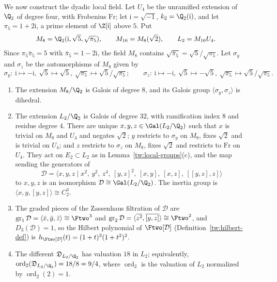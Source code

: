 We now construct the dyadic local field. Let $U_4$ be the
unramified extension of $\Q_2$ of degree four, with Frobenius $\mathrm{Fr}$;
let $\mathrm i=\sqrt{-1}$, $k_2=\Q_2(\mathrm i)$, and let
$\pi_5=1+2\mathrm i$, a prime element of $\Z[\mathrm i]$ above $5$. Put
\[
 M_8=\Q_2(\mathrm i,\sqrt5,\sqrt{\pi_5}),\qquad M_{16}=M_8(\sqrt2),\qquad
 L_2=M_{16}U_4 .
\]
Since $\pi_5\bar\pi_5=5$ with $\bar\pi_5=1-2\mathrm i$, the field $M_8$ contains
$\sqrt{\bar\pi_5}=\sqrt5/\sqrt{\pi_5}$. Let $\sigma_y$ and $\sigma_z$ be the
automorphisms of $M_8$ given by
\[
 \sigma_y:\ \mathrm i\mapsto-\mathrm i,\ \sqrt5\mapsto\sqrt5,\ \sqrt{\pi_5}\mapsto\sqrt5/\sqrt{\pi_5};
 \qquad
 \sigma_z:\ \mathrm i\mapsto-\mathrm i,\ \sqrt5\mapsto-\sqrt5,\ \sqrt{\pi_5}\mapsto\sqrt5/\sqrt{\pi_5}.
\]

\begin{lemma}\label{tw:local-two}
\begin{enumerate}
\item[(a)] The extension $M_8/\Q_2$ is Galois of degree $8$, and its Galois
 group $\langle\sigma_y,\sigma_z\rangle$ is dihedral.
\item[(b)] The extension $L_2/\Q_2$ is Galois of degree $32$, with
 ramification index $8$ and residue degree $4$. There are unique
 $x,y,z\in\Gal(L_2/\Q_2)$ such that $x$ is trivial on $M_8$ and $U_4$ and
 negates $\sqrt2$; $y$ restricts to $\sigma_y$ on $M_8$, fixes $\sqrt2$ and
 is trivial on $U_4$; and $z$ restricts to $\sigma_z$ on $M_8$, fixes $\sqrt2$
 and restricts to $\mathrm{Fr}$ on $U_4$. They act on $E_2\subset L_2$ as in
 Lemma~\ref{tw:local-groups}(c), and the map sending the generators of
 \[
  \mathcal D=\langle x,y,z\mid x^2,\ y^2,\ z^4,\ [y,z]^2,\ [x,y],\ [x,z],\ [[y,z],z]\rangle
 \]
 to $x,y,z$ is an isomorphism $\mathcal D\cong\Gal(L_2/\Q_2)$. The inertia group is
 $\langle x,y,[y,z]\rangle\cong C_2^3$.
\item[(c)] The graded pieces of the Zassenhaus filtration of $\mathcal D$ are
 $\operatorname{gr}_1\mathcal D=\langle\bar x,\bar y,\bar z\rangle\cong\Ftwo^3$ and
 $\operatorname{gr}_2\mathcal D=\langle\overline{z^2},\overline{[y,z]}\rangle\cong\Ftwo^2$,
 and $D_3(\mathcal D)=1$, so the Hilbert polynomial of $\Ftwo[\mathcal D]$
 (Definition~\ref{tw:hilbert-def}) is $h_{\Ftwo[\mathcal D]}(t)=(1+t)^3(1+t^2)^2$.
\item[(d)] The different $\mathfrak D_{L_2/\Q_2}$ has valuation $18$ in $L_2$;
 equivalently, $\operatorname{ord}_2(\mathfrak D_{L_2/\Q_2})=18/8=9/4$, where
 $\operatorname{ord}_2$ is the valuation of $L_2$ normalized by
 $\operatorname{ord}_2(2)=1$.
\end{enumerate}
\end{lemma}

